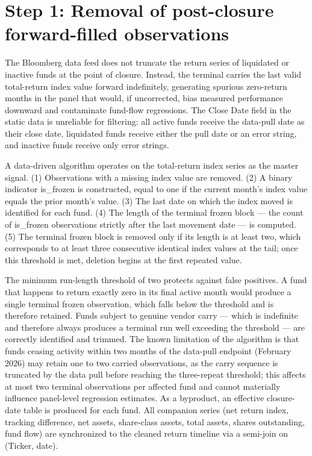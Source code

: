 \documentclass[12pt, oneside]{report}
\begin{document}
\section{Step 1: Removal of post-closure forward-filled observations}
\label{sec:frozen_tail}

\noindent The Bloomberg data feed does not truncate the return
series of liquidated or inactive funds at the point of closure. Instead,
the terminal carries the last valid total-return index value forward
indefinitely, generating spurious zero-return months in the panel that
would, if uncorrected, bias measured performance downward and
contaminate fund-flow regressions. The Close Date field in
the static data is unreliable for filtering: all active funds receive
the data-pull date as their close date, liquidated funds receive
either the pull date or an error string, and inactive funds receive
only error strings.

A data-driven algorithm operates on the total-return index series
as the master signal. (1) Observations with a missing index value are
removed. (2) A binary indicator is\_frozen is constructed,
equal to one if the current month's index value equals the prior
month's value. (3) The last date on which the index moved is identified
for each fund. (4) The length of the terminal frozen block --- the
count of is\_frozen observations strictly after the last
movement date --- is computed. (5) The terminal frozen block is removed
only if its length is at least two, which corresponds to at
least three consecutive identical index values at the tail; once this
threshold is met, deletion begins at the first repeated value.

The minimum run-length threshold of two protects against false
positives. A fund that happens to return exactly zero in its final
active month would produce a single terminal frozen observation,
which falls below the threshold and is therefore retained. Funds
subject to genuine vendor carry --- which is indefinite and therefore
always produces a terminal run well exceeding the threshold --- are
correctly identified and trimmed. The known limitation of the
algorithm is that funds ceasing activity within two months of the
data-pull endpoint (February 2026) may retain one to two carried
observations, as the carry sequence is truncated by the data
pull before reaching the three-repeat threshold; this affects at most
two terminal observations per affected fund and cannot materially
influence panel-level regression estimates. As a byproduct, an
effective closure-date table is produced for each fund. All companion
series (net return index, tracking difference, net assets, share-class
assets, total assets, shares outstanding, fund flow) are synchronized
to the cleaned return timeline via a semi-join on (Ticker, date).
\end{document}
